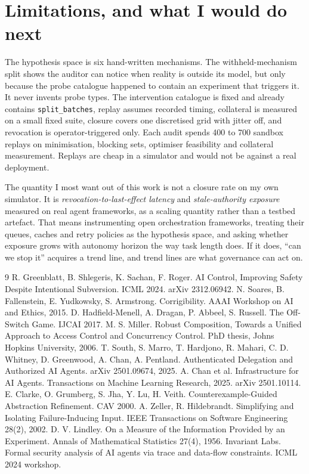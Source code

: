\documentclass[10pt]{article}
\begin{document}
\section{Limitations, and what I would do next}
The hypothesis space is six hand-written mechanisms. The withheld-mechanism split shows the auditor can notice when reality is outside its model, but only because the probe catalogue happened to contain an experiment that triggers it. It never invents probe types. The intervention catalogue is fixed and already contains \texttt{split\_batches}, replay assumes recorded timing, collateral is measured on a small fixed suite, closure covers one discretised grid with jitter off, and revocation is operator-triggered only. Each audit spends 400 to 700 sandbox replays on minimisation, blocking sets, optimiser feasibility and collateral measurement. Replays are cheap in a simulator and would not be against a real deployment.

The quantity I most want out of this work is not a closure rate on my own simulator. It is \emph{revocation-to-last-effect latency} and \emph{stale-authority exposure} measured on real agent frameworks, as a scaling quantity rather than a testbed artefact. That means instrumenting open orchestration frameworks, treating their queues, caches and retry policies as the hypothesis space, and asking whether exposure grows with autonomy horizon the way task length does. If it does, ``can we stop it'' acquires a trend line, and trend lines are what governance can act on.

\begin{thebibliography}{9}\footnotesize
{} R. Greenblatt, B. Shlegeris, K. Sachan, F. Roger. AI Control, Improving Safety Despite Intentional Subversion. ICML 2024. arXiv 2312.06942.
 N. Soares, B. Fallenstein, E. Yudkowsky, S. Armstrong. Corrigibility. AAAI Workshop on AI and Ethics, 2015.
 D. Hadfield-Menell, A. Dragan, P. Abbeel, S. Russell. The Off-Switch Game. IJCAI 2017.
 M. S. Miller. Robust Composition, Towards a Unified Approach to Access Control and Concurrency Control. PhD thesis, Johns Hopkins University, 2006.
 T. South, S. Marro, T. Hardjono, R. Mahari, C. D. Whitney, D. Greenwood, A. Chan, A. Pentland. Authenticated Delegation and Authorized AI Agents. arXiv 2501.09674, 2025.
 A. Chan et al. Infrastructure for AI Agents. Transactions on Machine Learning Research, 2025. arXiv 2501.10114.
 E. Clarke, O. Grumberg, S. Jha, Y. Lu, H. Veith. Counterexample-Guided Abstraction Refinement. CAV 2000.
 A. Zeller, R. Hildebrandt. Simplifying and Isolating Failure-Inducing Input. IEEE Transactions on Software Engineering 28(2), 2002.
 D. V. Lindley. On a Measure of the Information Provided by an Experiment. Annals of Mathematical Statistics 27(4), 1956.
 Invariant Labs. Formal security analysis of AI agents via trace and data-flow constraints. ICML 2024 workshop.
\end{thebibliography}
\end{document}
